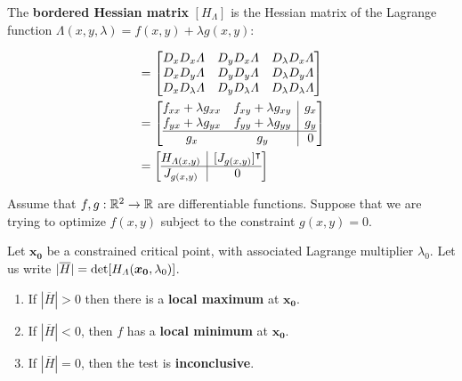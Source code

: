     \begin{definition}
    The \textbf{bordered Hessian matrix} $[H_\Lambda]$ is the Hessian matrix of the Lagrange function $\Lambda(x, y, \lambda)= f(x,y) + \lambda g(x,y)$:

    \begin{align*}
        [H_\Lambda] &= \begin{bmatrix}
D_xD_x \Lambda & D_yD_x \Lambda  & D_\lambda D_x \Lambda \\
D_xD_y \Lambda & D_yD_y \Lambda  & D_\lambda D_y \Lambda \\
D_xD_\lambda  \Lambda & D_yD_\lambda  \Lambda & D_\lambda D_\lambda \Lambda 
\end{bmatrix} \\ 
&= \left[\begin{array}{@{}cc|c@{}}
f_{xx} + \lambda g_{xx} & f_{xy} + \lambda g_{xy}  & g_x \\
f_{yx} + \lambda g_{yx} & f_{yy} + \lambda g_{yy}  & g_y \\
\hline
g_x & g_y  & 0
\end{array}\right] \\
&= \left[\begin{array}{@{}c|c@{}}
 H_{\Lambda(x,y)}  & [J_{g(x,y)}]^\intercal \\
\hline
J_{g(x,y)} & 0 
\end{array}\right]
    \end{align*}
    
\end{definition}

\begin{theorem}
    Assume that $f, g : \mathbb{R}^2 \to \mathbb{R}$ are differentiable functions.  Suppose that we are trying to optimize $f(x,y)$ subject to the constraint $g(x,y) = 0$.

    Let $\bm{x_0}$ be a constrained critical point, with associated Lagrange multiplier $\lambda_0$.  Let us write $|\overline{H}| = \textnormal{det}[H_\Lambda(\bm{x_0}, \lambda_0)]$.

    \begin{enumerate}
    \item If $|\overline{H}| > 0$ then there is a \textbf{local maximum} at $\bm{x_0}$.
    \item If $|\overline{H}| < 0$, then $f$ has a \textbf{local minimum} at $\bm{x_0}$. 
    \item If $|\overline{H}| = 0$, then the test is \textbf{inconclusive}. 
\end{enumerate}
    \end{theorem}


